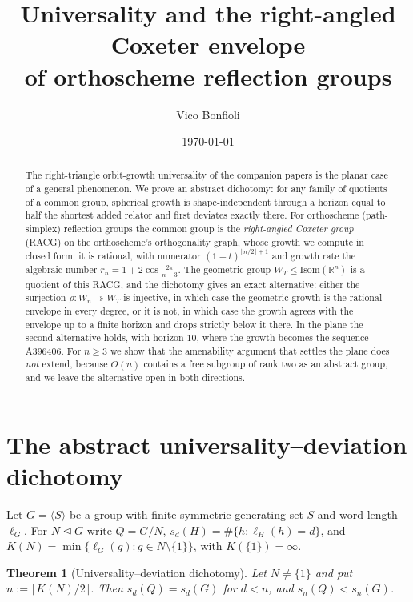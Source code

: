 \documentclass[11pt]{article}
\title{Universality and the right-angled Coxeter envelope\\ of orthoscheme reflection groups}
\author{Vico Bonfioli}
\date{\today}
\newcommand{\R}{\mathbb{R}}
\newtheorem{theorem}{Theorem}
\theoremstyle{definition}
\begin{document}
\maketitle

\begin{abstract}
\noindent The right-triangle orbit-growth universality of the companion papers is the planar case of a
general phenomenon. We prove an abstract dichotomy: for any family of quotients of a common group,
spherical growth is shape-independent through a horizon equal to half the shortest added relator and
first deviates exactly there. For orthoscheme (path-simplex) reflection groups the common group is the
\emph{right-angled Coxeter group} (RACG) on the orthoscheme's orthogonality graph, whose growth we
compute in closed form: it is rational, with numerator $(1+t)^{\lfloor n/2\rfloor+1}$ and growth rate
the algebraic number $r_n=1+2\cos\frac{2\pi}{n+3}$. The geometric group $W_T\le\mathrm{Isom}(\R^n)$ is
a quotient of this RACG, and the dichotomy gives an exact alternative: either the surjection
$\rho\colon W_n\twoheadrightarrow W_T$ is injective, in which case the geometric growth is the rational
envelope in every degree, or it is not, in which case the growth agrees with the envelope up to a finite
horizon and drops strictly below it there. In the plane the second alternative holds, with horizon
$10$, where the growth becomes the sequence \textup{A396406}. For $n\ge3$ we show that the amenability
argument that settles the plane does \emph{not} extend, because $O(n)$ contains a free subgroup of rank
two as an abstract group, and we leave the alternative open in both directions.
\end{abstract}

\section{The abstract universality--deviation dichotomy}

Let $G=\langle S\rangle$ be a group with finite symmetric generating set $S$ and word length $\ell_G$.
For $N\trianglelefteq G$ write $Q=G/N$, $s_d(H)=\#\{h:\ell_H(h)=d\}$, and $K(N)=\min\{\ell_G(g):g\in
N\setminus\{1\}\}$, with $K(\{1\})=\infty$.

\begin{theorem}[Universality--deviation dichotomy]
\label{thm:dichotomy}
Let $N\ne\{1\}$ and put $n:=\lceil K(N)/2\rceil$. Then $s_d(Q)=s_d(G)$ for $d<n$, and $s_n(Q)<s_n(G)$.
\end{theorem}
\end{document}
